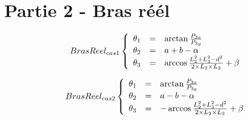 \documentclass[ebook,12pt,oneside,openany]{memoir}
\begin{document}
\section{Partie 2 - Bras réél}

  \[
   BrasReel_{cas1}
    \left\{
      \begin{array}{r c l}
        \theta _{1} &=& \arctan{\frac{P_{3x}}{P_{3y}}}\\
        \theta _{2} &=& a + b - \alpha\\
        \theta _{3} &=& \arccos{\frac{L_{2}^{2} + L_{3}^{2} - d^{2}}{2 \times L_{2} \times L_{3}}} + \beta\\
      \end{array}
    \right.
  \]
  
  \[
   BrasReel_{cas2}
    \left\{
      \begin{array}{r c l}
        \theta _{1} &=& \arctan{\frac{P_{3x}}{P_{3y}}}\\
        \theta _{2} &=& a - b - \alpha\\
        \theta _{3} &=& - \arccos{\frac{L_{2}^{2} + L_{3}^{2} - d^{2}}{2 \times L_{2} \times L_{3}}} + \beta\\
      \end{array}
    \right.
  \]
\end{document}
